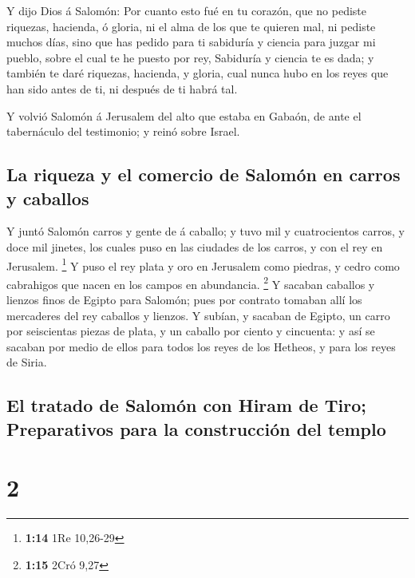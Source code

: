  Y dijo Dios á Salomón: Por cuanto esto fué en tu
corazón, que no pediste riquezas, hacienda, ó gloria, ni el alma de los
que te quieren mal, ni pediste muchos días, sino que has pedido para ti
sabiduría y ciencia para juzgar mi pueblo, sobre el cual te he puesto
por rey,  Sabiduría y ciencia te es dada; y también te
daré riquezas, hacienda, y gloria, cual nunca hubo en los reyes que han
sido antes de ti, ni después de ti habrá tal.

 Y volvió Salomón á Jerusalem del alto que estaba en
Gabaón, de ante el tabernáculo del testimonio; y reinó sobre Israel.

\hypertarget{la-riqueza-y-el-comercio-de-salomuxf3n-en-carros-y-caballos}{%
\subsection{La riqueza y el comercio de Salomón en carros y
caballos}\label{la-riqueza-y-el-comercio-de-salomuxf3n-en-carros-y-caballos}}

 Y juntó Salomón carros y gente de á caballo; y tuvo mil
y cuatrocientos carros, y doce mil jinetes, los cuales puso en las
ciudades de los carros, y con el rey en Jerusalem. \footnote{\textbf{1:14}
  1Re 10,26-29}  Y puso el rey plata y oro en Jerusalem
como piedras, y cedro como cabrahigos que nacen en los campos en
abundancia. \footnote{\textbf{1:15} 2Cró 9,27}  Y sacaban
caballos y lienzos finos de Egipto para Salomón; pues por contrato
tomaban allí los mercaderes del rey caballos y lienzos. 
Y subían, y sacaban de Egipto, un carro por seiscientas piezas de plata,
y un caballo por ciento y cincuenta: y así se sacaban por medio de ellos
para todos los reyes de los Hetheos, y para los reyes de Siria.

\hypertarget{el-tratado-de-salomuxf3n-con-hiram-de-tiro-preparativos-para-la-construcciuxf3n-del-templo}{%
\subsection{El tratado de Salomón con Hiram de Tiro; Preparativos para
la construcción del
templo}\label{el-tratado-de-salomuxf3n-con-hiram-de-tiro-preparativos-para-la-construcciuxf3n-del-templo}}

\hypertarget{section-1}{%
\section{2}\label{section-1}}

